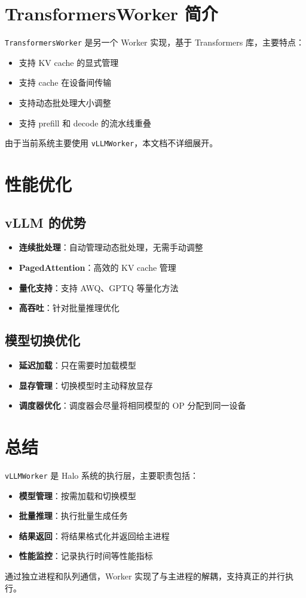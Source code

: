 \documentclass[12pt,a4paper]{article}
\begin{document}
\section{TransformersWorker 简介}

\texttt{TransformersWorker} 是另一个 Worker 实现，基于 Transformers 库，主要特点：

\begin{itemize}
    \item 支持 KV cache 的显式管理
    \item 支持 cache 在设备间传输
    \item 支持动态批处理大小调整
    \item 支持 prefill 和 decode 的流水线重叠
\end{itemize}

由于当前系统主要使用 \texttt{vLLMWorker}，本文档不详细展开。

\section{性能优化}

\subsection{vLLM 的优势}

\begin{itemize}
    \item \textbf{连续批处理}：自动管理动态批处理，无需手动调整
    \item \textbf{PagedAttention}：高效的 KV cache 管理
    \item \textbf{量化支持}：支持 AWQ、GPTQ 等量化方法
    \item \textbf{高吞吐}：针对批量推理优化
\end{itemize}

\subsection{模型切换优化}

\begin{itemize}
    \item \textbf{延迟加载}：只在需要时加载模型
    \item \textbf{显存管理}：切换模型时主动释放显存
    \item \textbf{调度器优化}：调度器会尽量将相同模型的 OP 分配到同一设备
\end{itemize}

\section{总结}

\texttt{vLLMWorker} 是 Halo 系统的执行层，主要职责包括：

\begin{itemize}
    \item \textbf{模型管理}：按需加载和切换模型
    \item \textbf{批量推理}：执行批量生成任务
    \item \textbf{结果返回}：将结果格式化并返回给主进程
    \item \textbf{性能监控}：记录执行时间等性能指标
\end{itemize}

通过独立进程和队列通信，Worker 实现了与主进程的解耦，支持真正的并行执行。
\end{document}
